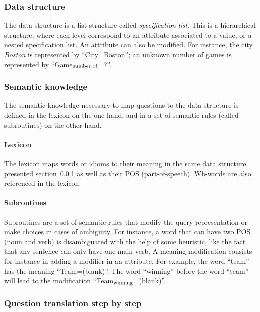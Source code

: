 \documentclass[10pt,journal,letterpaper,compsoc]{IEEEtran}
\begin{document}
\subsubsection{Data structure}
\label{sec:baseball-data-structure}
The data structure is a list structure called {\it specification list}. This is
a hierarchical structure, where each level correspond to an attribute associated
to a value, or a nested specification list.
An attribute can also be modified.
For instance, the city {\it Boston} is represented by ``City=Boston'';
an unknown number of games is represented by ``Game$_{\textnormal{number
of}}$=?''.



\subsubsection{Semantic knowledge}
The semantic knowledge necessary to map questions to the data structure is
defined in the lexicon on the one hand, and in a set of semantic rules (called
subroutines) on the other hand. 

\paragraph{Lexicon}
The lexicon maps words or idioms to their meaning in the same data structure
presented section~\ref{sec:baseball-data-structure} as well as their POS
(part-of-speech).
Wh-words are also referenced in the lexicon. 


\paragraph{Subroutines}
Subroutines are a set of semantic rules that modify the query representation or
make choices in cases of ambiguity. 
For instance, a word that can have two POS (noun and verb) is disambiguated with
the help of some heuristic, like the fact that any sentence can only have one
main verb. 
A meaning modification consists for instance in adding a modifier in an
attribute. 
For example, the word ``team'' has the meaning ``Team=(blank)''. The word
``winning'' before the word ``team'' will lead to the modification
``Team$_{\textnormal{winning}}$=(blank)''. 





\subsubsection{Question translation step by step}
\label{sec:baseball-question-translation}
\end{document}
